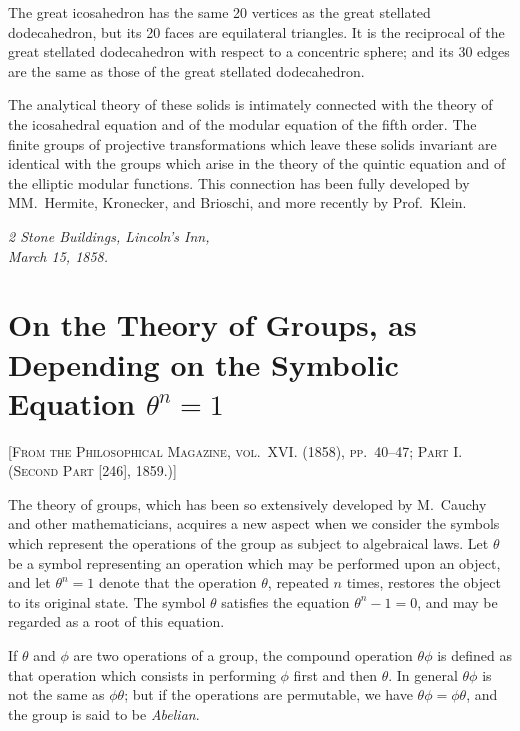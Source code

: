 \documentclass[11pt,a4paper]{article}
\begin{document}
\setcounter{page}{88}

The great icosahedron has the same 20 vertices as the great stellated dodecahedron, but its 20 faces are equilateral triangles. It is the reciprocal of the great stellated dodecahedron with respect to a concentric sphere; and its 30 edges are the same as those of the great stellated dodecahedron.

The analytical theory of these solids is intimately connected with the theory of the icosahedral equation and of the modular equation of the fifth order. The finite groups of projective transformations which leave these solids invariant are identical with the groups which arise in the theory of the quintic equation and of the elliptic modular functions. This connection has been fully developed by MM.~Hermite, Kronecker, and Brioschi, and more recently by Prof.~Klein.

\medskip
\noindent\textit{2 Stone Buildings, Lincoln's Inn,\\March 15, 1858.}

\newpage


\section{On the Theory of Groups, as Depending on the Symbolic Equation $\theta^n = 1$}

\textsc{[From the Philosophical Magazine, vol.~XVI. (1858), pp.~40--47; Part I. (Second Part [246], 1859.)]}
\label{paper:243}

\setcounter{page}{89}

The theory of groups, which has been so extensively developed by M.~Cauchy and other mathematicians, acquires a new aspect when we consider the symbols which represent the operations of the group as subject to algebraical laws. Let $\theta$ be a symbol representing an operation which may be performed upon an object, and let $\theta^n = 1$ denote that the operation $\theta$, repeated $n$ times, restores the object to its original state. The symbol $\theta$ satisfies the equation $\theta^n - 1 = 0$, and may be regarded as a root of this equation.

If $\theta$ and $\phi$ are two operations of a group, the compound operation $\theta\phi$ is defined as that operation which consists in performing $\phi$ first and then $\theta$. In general $\theta\phi$ is not the same as $\phi\theta$; but if the operations are permutable, we have $\theta\phi = \phi\theta$, and the group is said to be \textit{Abelian}.
\end{document}
